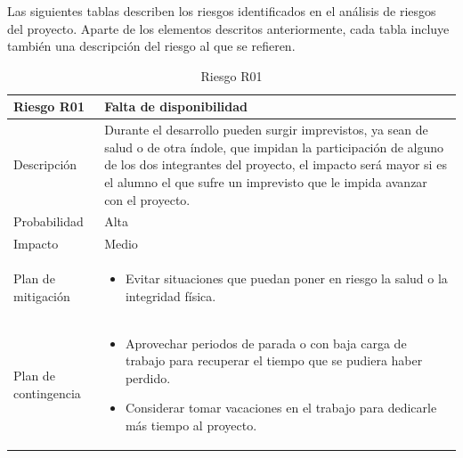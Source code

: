 Las siguientes tablas describen los riesgos identificados en el análisis de riesgos del proyecto. Aparte de los elementos descritos anteriormente, cada tabla incluye también una descripción del riesgo al que se refieren.

\begin{table}[H]
	\centering
	\footnotesize
	\begin{tabularx}{\textwidth}{|l|X|}
		\hline
		\rowcolor[HTML]{C0C0C0} 
		\textbf{Riesgo R01}  & \textbf{Falta de disponibilidad} \\ \hline
		Descripción          & Durante el desarrollo pueden surgir imprevistos, ya sean de salud o de otra índole, que impidan la participación de alguno de los dos integrantes del proyecto, el impacto será mayor si es el alumno el que sufre un imprevisto que le impida avanzar con el proyecto.\\ \hline
		Probabilidad         & Alta \\ \hline
		Impacto              & Medio \\ \hline
		Plan de mitigación   & \begin{minipage}[t]{\linewidth}
			\begin{itemize}[leftmargin=*, noitemsep]
				\item Evitar situaciones que puedan poner en riesgo la salud o la integridad física.
			\end{itemize}
		\end{minipage} \\ \hline
		Plan de contingencia & \begin{minipage}[t]{\linewidth}
			\begin{itemize}[leftmargin=*, noitemsep]
				\item Aprovechar periodos de parada o con baja carga de trabajo para recuperar el tiempo que se pudiera haber perdido.
				\item Considerar tomar vacaciones en el trabajo para dedicarle más tiempo al proyecto.
			\end{itemize}
		\end{minipage} \\ \hline
	\end{tabularx}
	\caption{Riesgo R01}
	\label{tab:riesgo_1}
\end{table}


